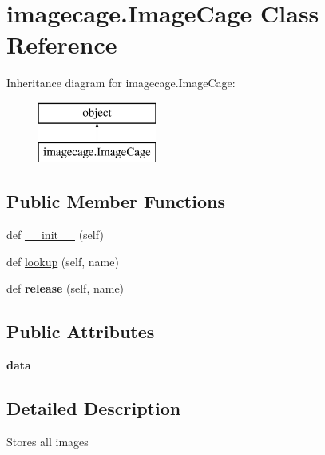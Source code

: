 \hypertarget{classimagecage_1_1_image_cage}{}\section{imagecage.\+Image\+Cage Class Reference}
\label{classimagecage_1_1_image_cage}
Inheritance diagram for imagecage.\+Image\+Cage\+:\begin{figure}[H]
\begin{center}
\leavevmode
\includegraphics[height=2.000000cm]{classimagecage_1_1_image_cage}
\end{center}
\end{figure}
\subsection*{Public Member Functions}
\begin{DoxyCompactItemize}
\item 
def \hyperlink{classimagecage_1_1_image_cage_a57e065fd86e19915428a219f094e86fd}{\+\_\+\+\_\+init\+\_\+\+\_\+} (self)
\item 
def \hyperlink{classimagecage_1_1_image_cage_a2ddd0c8a34f439d6b214a94a9e802964}{lookup} (self, name)
\item 
\hypertarget{classimagecage_1_1_image_cage_a7838f1dc057c25764f6e6d3c1ae14e0c}{}def {\bfseries release} (self, name)\label{classimagecage_1_1_image_cage_a7838f1dc057c25764f6e6d3c1ae14e0c}

\end{DoxyCompactItemize}
\subsection*{Public Attributes}
\begin{DoxyCompactItemize}
\item 
\hypertarget{classimagecage_1_1_image_cage_af24229b44297966f0f739a7e20c58861}{}{\bfseries data}\label{classimagecage_1_1_image_cage_af24229b44297966f0f739a7e20c58861}

\end{DoxyCompactItemize}


\subsection{Detailed Description}
\begin{DoxyVerb}Stores all images
\end{DoxyVerb}
 

